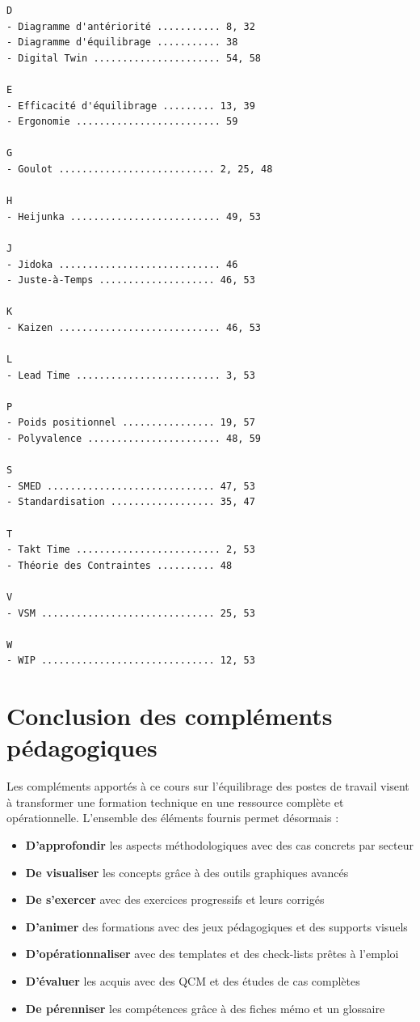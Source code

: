 \documentclass[12pt,a4paper]{article}
\begin{document}
\begin{center}
\begin{verbatim}
D
- Diagramme d'antériorité ........... 8, 32
- Diagramme d'équilibrage ........... 38
- Digital Twin ...................... 54, 58

E
- Efficacité d'équilibrage ......... 13, 39
- Ergonomie ......................... 59

G
- Goulot ........................... 2, 25, 48

H
- Heijunka .......................... 49, 53

J
- Jidoka ............................ 46
- Juste-à-Temps .................... 46, 53

K
- Kaizen ............................ 46, 53

L
- Lead Time ......................... 3, 53

P
- Poids positionnel ................ 19, 57
- Polyvalence ....................... 48, 59

S
- SMED ............................. 47, 53
- Standardisation .................. 35, 47

T
- Takt Time ......................... 2, 53
- Théorie des Contraintes .......... 48

V
- VSM .............................. 25, 53

W
- WIP .............................. 12, 53
\end{verbatim}


\section*{Conclusion des compléments pédagogiques}

Les compléments apportés à ce cours sur l'équilibrage des postes de travail visent à transformer une formation technique en une ressource complète et opérationnelle. L'ensemble des éléments fournis permet désormais :

\begin{itemize}
    \item \textbf{D'approfondir} les aspects méthodologiques avec des cas concrets par secteur
    \item \textbf{De visualiser} les concepts grâce à des outils graphiques avancés
    \item \textbf{De s'exercer} avec des exercices progressifs et leurs corrigés
    \item \textbf{D'animer} des formations avec des jeux pédagogiques et des supports visuels
    \item \textbf{D'opérationnaliser} avec des templates et des check-lists prêtes à l'emploi
    \item \textbf{D'évaluer} les acquis avec des QCM et des études de cas complètes
    \item \textbf{De pérenniser} les compétences grâce à des fiches mémo et un glossaire
\end{itemize}


\end{center}
\end{document}
